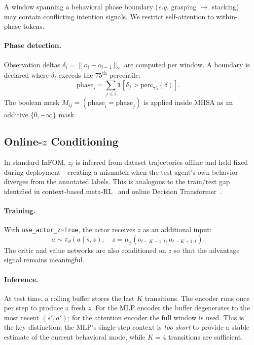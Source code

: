 \documentclass{article}
\newcommand{\eg}{\textit{e.g.}}
\newcommand{\base}{InFOM}
\begin{document}
A window spanning a behavioral phase boundary (\eg{} grasping
$\to$ stacking) may contain conflicting intention signals.
We restrict self-attention to within-phase tokens.

\paragraph{Phase detection.}
Observation deltas $\delta_i = \|o_i - o_{i-1}\|_2$
are computed per window.
A boundary is declared where $\delta_i$ exceeds the
$75^\text{th}$ percentile:
\begin{equation}
    \text{phase}_i = \sum_{j\leq i}
    \mathbf{1}\!\left[\delta_j > \mathrm{perc}_{75}(\delta)\right].
\end{equation}
The boolean mask $M_{ij} = (\text{phase}_i = \text{phase}_j)$
is applied inside MHSA as an additive $\{0,-\infty\}$ mask.

\subsection{Online-$z$ Conditioning}
\label{sec:onlinez}

In standard \base{}, $z_t$ is inferred from dataset trajectories
offline and held fixed during deployment—creating a mismatch
when the test agent's own behavior diverges from the
annotated labels.
This is analogous to the train/test gap identified in
context-based meta-RL~\cite{rakelly2019pearl}
and online Decision Transformer~\cite{zheng2022odt}.

\paragraph{Training.}
With \texttt{use\_actor\_z=True}, the actor receives $z$ as
an additional input:
\begin{equation}
    a \sim \pi_\theta(a \mid s, z),
    \quad
    z = \mu_\phi(o_{t-K+1:t}, a_{t-K+1:t}).
\end{equation}
The critic and value networks are also conditioned on $z$
so that the advantage signal remains meaningful.

\paragraph{Inference.}
At test time, a rolling buffer stores the last $K$ transitions.
The encoder runs once per step to produce a fresh $z$.
For the MLP encoder the buffer degenerates to the most recent
$(s',a')$; for the attention encoder the full window is used.
This is the key distinction: the MLP's single-step context is
\emph{too short} to provide a stable estimate of the current
behavioral mode, while $K=4$ transitions are sufficient.
\end{document}
